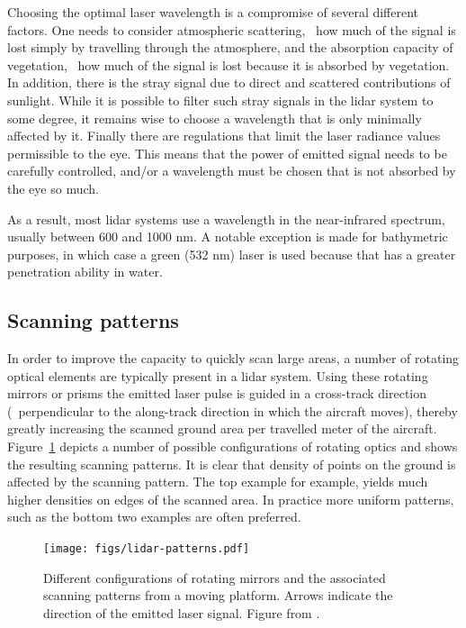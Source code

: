 Choosing the optimal laser wavelength is a compromise of several different factors. 
One needs to consider atmospheric scattering, 
\ie\ how much of the signal is lost simply by travelling through the atmosphere, and the absorption capacity of vegetation, \ie\ how much of  the signal is lost because it is absorbed by vegetation. In addition, there is the stray signal due to direct and scattered contributions of sunlight. While it is possible to filter such stray signals in the lidar system to some degree, it remains wise to choose a wavelength that is only minimally affected by it. Finally there are regulations that limit the laser radiance values permissible to the eye. This means that the power of emitted signal needs to be carefully controlled, and/or a wavelength must be chosen that  is not absorbed by the eye so much.

As a result, most lidar systems use a wavelength in the near-infrared spectrum, usually between 600 and 1000 nm. A notable exception is made for bathymetric purposes, in which case a green (532 nm) laser is used because that has a greater penetration ability in water.

\subsection{Scanning patterns}
In order to improve the capacity to quickly scan large areas, a number of rotating optical elements are typically present in a lidar system. Using these rotating mirrors or prisms the emitted laser pulse is guided in a cross-track direction (\ie\ perpendicular to the along-track direction in which  the aircraft moves),  thereby greatly increasing the scanned ground area  per travelled meter of the aircraft.
Figure~\ref{fig:lidar-patterns} depicts a number of possible configurations of rotating optics and shows the resulting scanning patterns. It is clear that density of points on the ground is affected by the scanning pattern. The top example for example, yields much higher densities on edges of the scanned area. In practice more uniform patterns, such  as the bottom two examples are often preferred.

\begin{figure}
	\centering
	\texttt{[image: figs/lidar-patterns.pdf]}
	\caption{Different configurations of rotating mirrors and the associated scanning patterns from a moving platform. Arrows indicate the direction of the emitted laser signal. Figure from \citet{Chazette16}.}%
\label{fig:lidar-patterns}
\end{figure}



